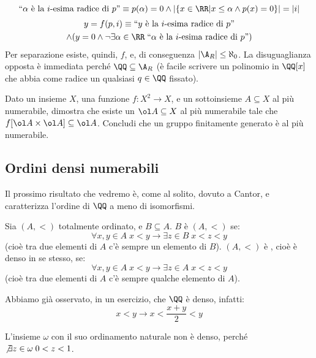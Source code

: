 \documentclass[11pt]{scrartcl}
\begin{document}
\[
	\text{``$\alpha$ è la $i$-esima radice di $p$''} \equiv \\
	p(\alpha) = 0 \land |\{x \in \RR | x \leq \alpha \land p(x) = 0\}| = |i|
\]
\begin{multline*}
	y = f(p,i) \equiv \text{``$y$ è la $i$-esima radice di $p$''} \\
	\land(y = 0 \land \neg \exists \alpha \in \RR \; \text{``$\alpha$ è la $i$-esima radice di $p$''})
\end{multline*}
Per separazione esiste, quindi, $f$, e, di conseguenza $|\A_R| \leq \aleph_0$. La disuguaglianza opposta è immediata perché $\QQ \subseteq \A_R$ (è facile scrivere un polinomio in $\QQ[x]$ che abbia come radice un qualsiasi $q \in \QQ$ fissato).

\begin{exercise}
	Dato un insieme $X$, una funzione $f : X^2 \rightarrow X$, e un sottoinsieme $A \subseteq X$ al più numerabile, dimostra che esiste un $\ol A \subseteq X$ al più numerabile tale che 
	$f[\ol A \times \ol A] \subseteq \ol A$. Concludi che un gruppo finitamente generato è al più numerabile.
\end{exercise}

\subsection{Ordini densi numerabili}
Il prossimo risultato che vedremo è, come al solito, dovuto a Cantor, e caratterizza l'ordine di $\QQ$ a meno di isomorfismi.

\begin{definition}[Densità]
	Sia $(A,<)$ totalmente ordinato, e $B \subseteq A$. $B$ è  $(A,<)$ se:
	\[ \forall x,y \in A \; x < y \rightarrow \exists z \in B \; x < z < y
		\]
	(cioè tra due elementi di $A$ c'è sempre un elemento di $B$). $(A, <)$ è , cioè è denso in se stesso, se:
	\[ \forall x,y \in A \; x < y \rightarrow \exists z \in A \; x < z < y
		\]
		(cioè tra due elementi di $A$ c'è sempre qualche elemento di $A$).
\end{definition}

\begin{example}
	Abbiamo già osservato, in un esercizio, che $\QQ$ è denso, infatti:
	\[ x < y \rightarrow x < \frac{x+y}{2} < y
		\]
\end{example}

\begin{notexample}
	L'insieme $\omega$ con il suo ordinamento naturale non è denso, perché $\not\exists z \in \omega \; 0 < z < 1$.
\end{notexample}
\end{document}
